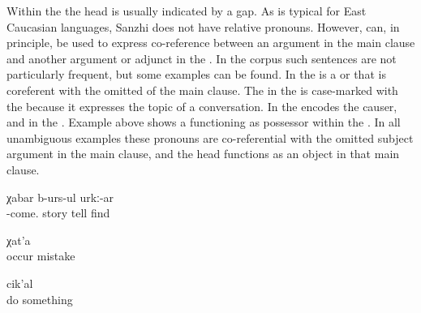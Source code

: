 Within the  the head is usually indicated by a gap. As is typical for East Caucasian languages, Sanzhi does not have relative pronouns. However,  can, in principle, be used to express co-reference between an argument in the main clause and another argument or adjunct in the . In the corpus such sentences are not particularly frequent, but some examples can be found. In  the  is a  or  that is coreferent with the omitted  of the main clause. The  in the  is case-marked with the  because it expresses the topic of a conversation. In  the  encodes the causer, and in  the . Example  above shows a  functioning as possessor within the . In all unambiguous examples these pronouns are co-referential with the omitted subject argument in the main clause, and the head functions as an object in that main clause.
%
\begin{exe}
	\ex	\label{ex:He is probably telling the story about what he had experienced}
		χabar	b-urs-ul	urkː-ar	\\
			-come.	story	tell	find\\
	\glt	{}

	\ex	\label{ex:the mistakes that were caused by him}
		χat'a\\
			occur	mistake\\
	\glt	{}

	\ex	\label{ex:(he is remembering) the things that he had done}
		cik'al\\
			do 	something\\
	\glt	{}
\end{exe}

